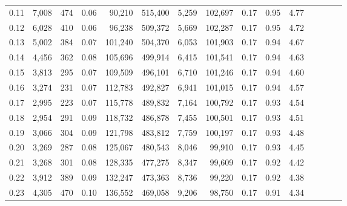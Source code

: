 \begin{tabular}{rrrcrrrrrrrrrrr}
0.11 &   7,008 &    474 &                                       0.06 &   90,210 &  515,400 &    5,259 &  102,697 &  0.17 &  0.95 &                         4.77 \\
0.12 &   6,028 &    410 &                                       0.06 &   96,238 &  509,372 &    5,669 &  102,287 &  0.17 &  0.95 &                         4.72 \\
0.13 &   5,002 &    384 &                                       0.07 &  101,240 &  504,370 &    6,053 &  101,903 &  0.17 &  0.94 &                         4.67 \\
0.14 &   4,456 &    362 &                                       0.08 &  105,696 &  499,914 &    6,415 &  101,541 &  0.17 &  0.94 &                         4.63 \\
0.15 &   3,813 &    295 &                                       0.07 &  109,509 &  496,101 &    6,710 &  101,246 &  0.17 &  0.94 &                         4.60 \\
0.16 &   3,274 &    231 &                                       0.07 &  112,783 &  492,827 &    6,941 &  101,015 &  0.17 &  0.94 &                         4.57 \\
0.17 &   2,995 &    223 &                                       0.07 &  115,778 &  489,832 &    7,164 &  100,792 &  0.17 &  0.93 &                         4.54 \\
0.18 &   2,954 &    291 &                                       0.09 &  118,732 &  486,878 &    7,455 &  100,501 &  0.17 &  0.93 &                         4.51 \\
0.19 &   3,066 &    304 &                                       0.09 &  121,798 &  483,812 &    7,759 &  100,197 &  0.17 &  0.93 &                         4.48 \\
0.20 &   3,269 &    287 &                                       0.08 &  125,067 &  480,543 &    8,046 &   99,910 &  0.17 &  0.93 &                         4.45 \\
0.21 &   3,268 &    301 &                                       0.08 &  128,335 &  477,275 &    8,347 &   99,609 &  0.17 &  0.92 &                         4.42 \\
0.22 &   3,912 &    389 &                                       0.09 &  132,247 &  473,363 &    8,736 &   99,220 &  0.17 &  0.92 &                         4.38 \\
0.23 &   4,305 &    470 &                                       0.10 &  136,552 &  469,058 &    9,206 &   98,750 &  0.17 &  0.91 &                         4.34 \\

\end{tabular}
